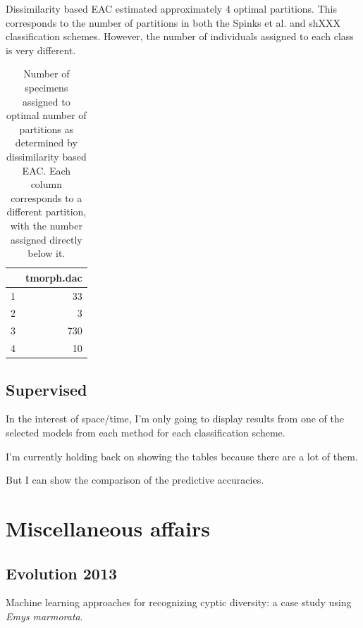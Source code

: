 \documentclass{article}\usepackage{graphicx, color}
\begin{document}
Dissimilarity based EAC estimated approximately 4 optimal partitions. This corresponds to the number of partitions in both the Spinks et al. and shXXX classification schemes. However, the number of individuals assigned to each class is very different.

\begin{table}[ht]
\begin{center}
\begin{tabular}{rr}
  \hline
 & tmorph.dac \\ 
  \hline
1 &  33 \\ 
  2 &   3 \\ 
  3 & 730 \\ 
  4 &  10 \\ 
   \hline
\end{tabular}
\caption{Number of specimens assigned to optimal number of partitions as determined by dissimilarity based EAC. Each column corresponds to a different partition, with the number assigned directly below it.}
\label{tab:dac}
\end{center}
\end{table}







\subsection{Supervised}

In the interest of space/time, I'm only going to display results from one of the selected models from each method for each classification scheme.










I'm currently holding back on showing the tables because there are a lot of them.

But I can show the comparison of the predictive accuracies.





\section{Miscellaneous affairs}
\subsection{Evolution 2013}
Machine learning approaches for recognizing cyptic diversity: a case study using \textit{Emys marmorata}.
\end{document}
